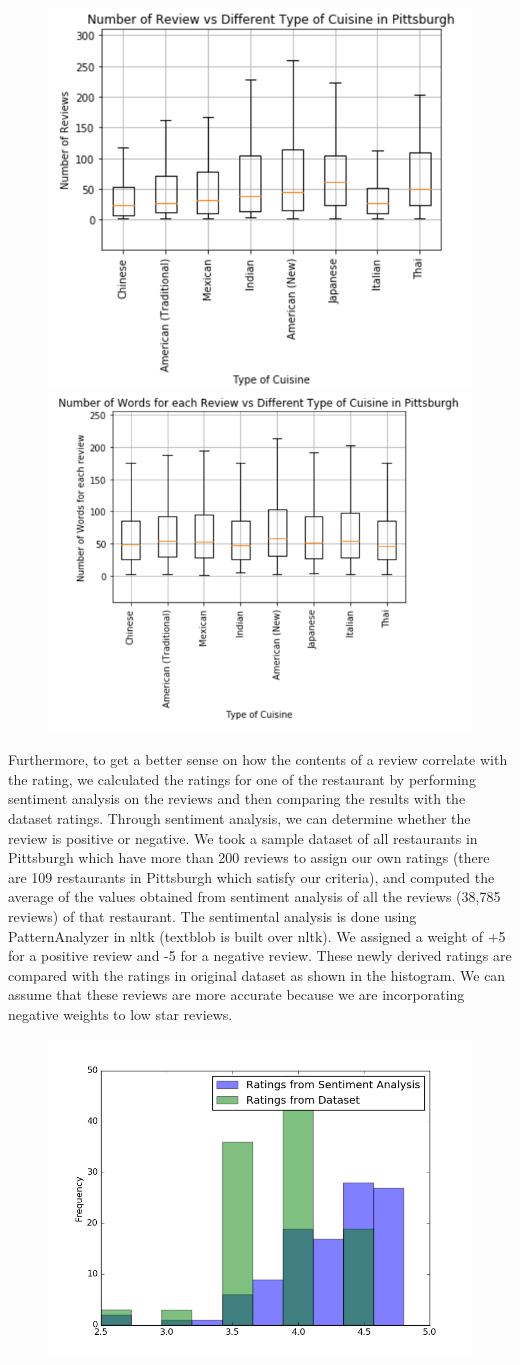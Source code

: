 \documentclass{neu_handout}
\begin{document}
\begin{figure}[h]
\centering
{
\includegraphics[width=0.35\linewidth]{number_of_review_vs_cuisine}
}
{
\includegraphics[width=0.4\linewidth]{average_review_length}
}
\end{figure}


Furthermore, to get a better sense on how the contents of a review correlate with the rating, we calculated the ratings for one of the restaurant by performing sentiment analysis on the reviews and then comparing the results with the dataset ratings. Through sentiment analysis, we can determine whether the review is positive or negative. We took a sample dataset of all restaurants in Pittsburgh which have more than 200 reviews to assign our own ratings (there are 109 restaurants in Pittsburgh which satisfy our criteria), and computed the average of the values obtained from sentiment analysis of all the reviews (38,785 reviews) of that restaurant. The sentimental analysis is done using PatternAnalyzer in nltk (textblob is built over nltk). We assigned a weight of +5 for a positive review and -5 for a negative review. These newly derived ratings are compared with the ratings in original dataset as shown in the histogram. We can assume that these reviews are more accurate because we are incorporating negative weights to low star reviews.

\begin{figure}[h]
\centering
{
\includegraphics[width=0.4\linewidth]{sentimentanalysis}
}
\end{figure}
\end{document}
